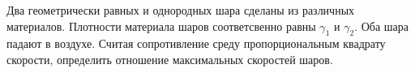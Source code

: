 Два геометрически равных и однородных шара сделаны из различных
материалов. Плотности материала шаров соответсвенно равны $\gamma_{1}$ и
$\gamma_{2}$. Оба шара падают в воздухе. Считая сопротивление среду
пропорциональным квадрату скорости, определить отношение максимальных
скоростей шаров.
